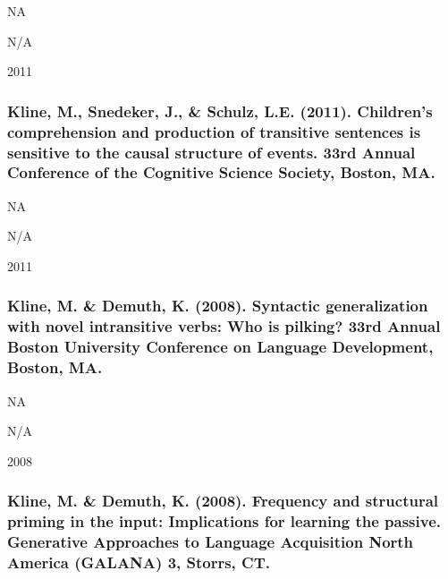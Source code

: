 \documentclass[
]{article}
\begin{document}
NA

N/A

2011

\hypertarget{kline-m.-snedeker-j.-schulz-l.e.-2011.-childrens-comprehension-and-production-of-transitive-sentences-is-sensitive-to-the-causal-structure-of-events.-33rd-annual-conference-of-the-cognitive-science-society-boston-ma.}{%
\subsubsection{Kline, M., Snedeker, J., \& Schulz, L.E. (2011).
Children's comprehension and production of transitive sentences is
sensitive to the causal structure of events. 33rd Annual Conference of
the Cognitive Science Society, Boston,
MA.}\label{kline-m.-snedeker-j.-schulz-l.e.-2011.-childrens-comprehension-and-production-of-transitive-sentences-is-sensitive-to-the-causal-structure-of-events.-33rd-annual-conference-of-the-cognitive-science-society-boston-ma.}}

NA

N/A

2011

\hypertarget{kline-m.-demuth-k.-2008.-syntactic-generalization-with-novel-intransitive-verbs-who-is-pilking-33rd-annual-boston-university-conference-on-language-development-boston-ma.}{%
\subsubsection{Kline, M. \& Demuth, K. (2008). Syntactic generalization
with novel intransitive verbs: Who is pilking? 33rd Annual Boston
University Conference on Language Development, Boston,
MA.}\label{kline-m.-demuth-k.-2008.-syntactic-generalization-with-novel-intransitive-verbs-who-is-pilking-33rd-annual-boston-university-conference-on-language-development-boston-ma.}}

NA

N/A

2008

\hypertarget{kline-m.-demuth-k.-2008.-frequency-and-structural-priming-in-the-input-implications-for-learning-the-passive.-generative-approaches-to-language-acquisition-north-america-galana-3-storrs-ct.}{%
\subsubsection{Kline, M. \& Demuth, K. (2008). Frequency and structural
priming in the input: Implications for learning the passive. Generative
Approaches to Language Acquisition North America (GALANA) 3, Storrs,
CT.}\label{kline-m.-demuth-k.-2008.-frequency-and-structural-priming-in-the-input-implications-for-learning-the-passive.-generative-approaches-to-language-acquisition-north-america-galana-3-storrs-ct.}}
\end{document}
